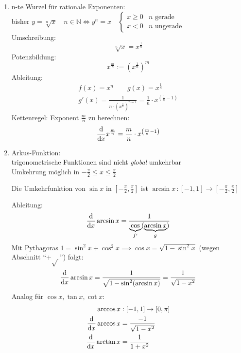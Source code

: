 \begin{example}[Umkehrfunktionen]
\begin{enumerate}

    \item n-te Wurzel für rationale Exponenten:\\
        bisher $y = \sqrt[n]{x} \quad n \in \mathbb{N} \Leftrightarrow y^n = x \quad
            \begin{cases}
                x \geq 0 & \text{$n$ gerade} \\
                x < 0 & \text{$n$ ungerade}
            \end{cases}
        $\\
        Umschreibung:
        \[\sqrt[n]{x} = x^{\frac{1}{n}}\]
        Potenzbildung:
        \[x^{\frac{m}{n}} := \left(x^{\frac{1}{n}}\right)^m\]
        Ableitung:
        \begin{align*}
            f(x)=x^n \qquad g(x) = x^{\frac{1}{n}}\\
            g'(x)=\frac{1}{n \cdot \left(x^{\frac{1}{n}}\right)^{n-1}}=\frac{1}{n} \cdot x^{\left(\frac{1}{n}-1\right)}
        \end{align*}
        Kettenregel: Exponent $\frac{m}{n}$ zu berechnen:\\
        \[ \frac{\mathrm d}{\mathrm d x}x^{\frac{m}{n}} = \frac{m}{n} \cdot x^{\left(\frac{m}{n}-1\right)}\]
    \item Arkus-Funktion:\\
        trigonometrische Funktionen sind nicht \emph{global} umkehrbar\\
        Umkehrung möglich in $-\frac{\pi}{2} \leq x \leq \frac{\pi}{2}$
        \begin{definition}
        Die Umkehrfunktion von $\sin x$ in $[-\frac{\pi}{2}, \frac{\pi}{2}]$ ist $\arcsin x\,:[-1,1]\to[-\frac{\pi}{2}, \frac{\pi}{2}]$
        \end{definition}
        Ableitung:
        \[\frac{\mathrm d}{\mathrm d x}\arcsin x=\frac{1}{\underbrace{\cos}_{f'}(\underbrace{\arcsin x}_{g})}\]
        Mit Pythagoras $1=\sin^2 x+\cos^2 x \implies \cos x=\sqrt{1-\sin^2 x}$ (wegen Abschnitt "`$+\sqrt{\,}$"') folgt:
        \[\frac{\mathrm d}{\mathrm d x}\arcsin x = \frac{1}{\sqrt{1-\sin^2(\arcsin x)}} = \frac{1}{\sqrt{1-x^2}}\]
        Analog für $\cos x, \tan x, \cot x$:
        \begin{align*}
            \arccos x&: [-1,1]\to[0,\pi]\\
            \frac{\mathrm d}{\mathrm d x} \arccos x &= \frac{-1}{\sqrt{1-x^2}}\\
            \frac{\mathrm d}{\mathrm d x} \arctan x &= \frac{1}{1+x^2}
        \end{align*}

\end{enumerate}
\end{example}

